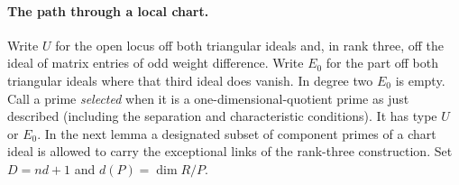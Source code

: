 \paragraph{The path through a local chart.}
Write \(U\) for the open locus off both triangular ideals and, in
rank three, off the ideal of matrix entries of odd weight difference.
Write \(E_0\) for the part off both triangular ideals where that
third ideal does vanish. In degree two \(E_0\) is empty. Call a prime
\emph{selected} when it is a one-dimensional-quotient prime as just
described (including the separation and characteristic conditions).
It has type \(U\) or \(E_0\). In the next lemma a designated subset
of component primes of a chart ideal is allowed to carry the
exceptional links of the rank-three construction. Set \(D=nd+1\)
and \(d(P)=\dim R/P\).

